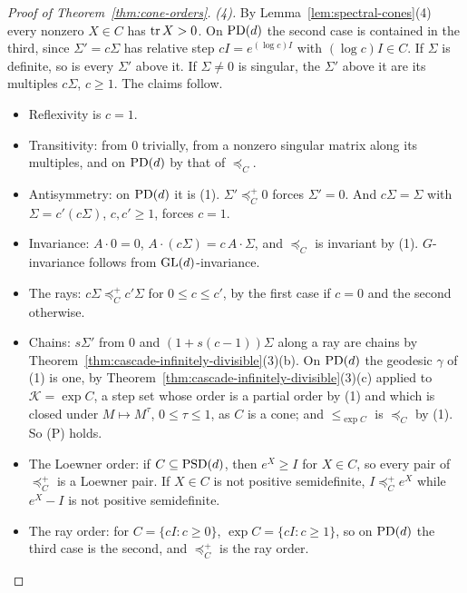 \begin{proof}[Proof of Theorem~\ref{thm:cone-orders}]
\emph{(4).} By Lemma~\ref{lem:spectral-cones}(4) every nonzero $X \in C$ has $\operatorname{tr} X > 0$.
On $\mathrm{PD}(d)$ the second case is contained in the third, since $\Sigma' = c\Sigma$ has relative step
$cI = e^{(\log c)I}$ with $(\log c)I \in C$. If $\Sigma$ is definite, so is every $\Sigma'$ above it. If
$\Sigma \ne 0$ is singular, the $\Sigma'$ above it are its multiples $c\Sigma$, $c \ge 1$. The claims follow.
\begin{itemize}
\item Reflexivity is $c = 1$.
\item Transitivity: from $0$ trivially, from a nonzero singular matrix along its multiples, and on
$\mathrm{PD}(d)$ by that of $\preceq_C$.
\item Antisymmetry: on $\mathrm{PD}(d)$ it is (1). $\Sigma' \preceq^+_C 0$ forces $\Sigma' = 0$. And $c\Sigma = \Sigma$
with $\Sigma = c'(c\Sigma)$, $c, c' \ge 1$, forces $c = 1$.
\item Invariance: $A \cdot 0 = 0$, $A \cdot (c\Sigma) = c\,A\cdot\Sigma$, and $\preceq_C$ is invariant by (1).
$G$-invariance follows from $\mathrm{GL}(d)$-invariance.
\item The rays: $c\Sigma \preceq^+_C c'\Sigma$ for $0 \le c \le c'$, by the first case if $c = 0$ and the
second otherwise.
\item Chains: $s\Sigma'$ from $0$ and $(1 + s(c-1))\Sigma$ along a ray are chains by
Theorem~\ref{thm:cascade-infinitely-divisible}(3)(b). On $\mathrm{PD}(d)$ the geodesic $\gamma$ of (1) is one, by
Theorem~\ref{thm:cascade-infinitely-divisible}(3)(c) applied to $\mathcal K = \exp C$, a step set whose order is a partial
order by (1) and which is closed under $M \mapsto M^\tau$, $0 \le \tau \le 1$, as $C$ is a cone; and
$\le_{\exp C}$ is $\preceq_C$ by (1). So (P) holds.
\item The Loewner order: if $C \subseteq \mathrm{PSD}(d)$, then $e^X \ge I$ for $X \in C$, so every pair of
$\preceq^+_C$ is a Loewner pair. If $X \in C$ is not positive semidefinite, $I \preceq^+_C e^X$ while
$e^X - I$ is not positive semidefinite.
\item The ray order: for $C = \{cI : c \ge 0\}$, $\exp C = \{cI : c \ge 1\}$, so on $\mathrm{PD}(d)$ the third case
is the second, and $\preceq^+_C$ is the ray order.
\end{itemize}
\end{proof}

